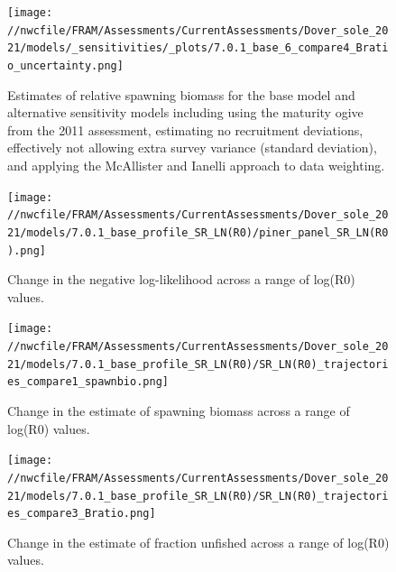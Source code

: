 \documentclass[11pt,
  english,
  a4paper,
]{article}
\begin{document}
\begin{figure}
\centering
\texttt{[image: //nwcfile/FRAM/Assessments/CurrentAssessments/Dover\_sole\_2021/models/\_sensitivities/\_plots/7.0.1\_base\_6\_compare4\_Bratio\_uncertainty.png]}
\caption{Estimates of relative spawning biomass for the base model and alternative sensitivity models including using the maturity ogive from the 2011 assessment, estimating no recruitment deviations, effectively not allowing extra survey variance (standard deviation), and applying the McAllister and Ianelli approach to data weighting.\label{fig:sens-biodata-relssb}}
\end{figure}

\tagmcend\tagstructend


\begin{figure}
\centering
\texttt{[image: //nwcfile/FRAM/Assessments/CurrentAssessments/Dover\_sole\_2021/models/7.0.1\_base\_profile\_SR\_LN(R0)/piner\_panel\_SR\_LN(R0).png]}
\caption{Change in the negative log-likelihood across a range of log(R0) values.\label{fig:r0-profile}}
\end{figure}

\tagmcend\tagstructend


\begin{figure}
\centering
\texttt{[image: //nwcfile/FRAM/Assessments/CurrentAssessments/Dover\_sole\_2021/models/7.0.1\_base\_profile\_SR\_LN(R0)/SR\_LN(R0)\_trajectories\_compare1\_spawnbio.png]}
\caption{Change in the estimate of spawning biomass across a range of log(R0) values.\label{fig:r0-ssb}}
\end{figure}

\tagmcend\tagstructend


\begin{figure}
\centering
\texttt{[image: //nwcfile/FRAM/Assessments/CurrentAssessments/Dover\_sole\_2021/models/7.0.1\_base\_profile\_SR\_LN(R0)/SR\_LN(R0)\_trajectories\_compare3\_Bratio.png]}
\caption{Change in the estimate of fraction unfished across a range of log(R0) values.\label{fig:r0-depl}}
\end{figure}
\end{document}
